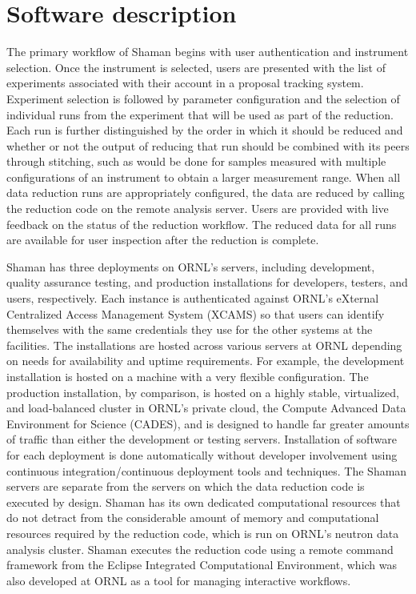 \section{Software description}
\label{description}

The primary workflow of Shaman begins with user authentication and instrument selection. Once the
instrument is selected, users are presented with the list of experiments associated with their
account in a proposal tracking system. Experiment selection is followed by parameter configuration
and the selection of individual runs from the experiment that will be used as part of the reduction.
Each run is further distinguished by the order in which it should be reduced and whether or not the
output of reducing that run should be combined with its peers through stitching, such as would be
done for samples measured with multiple configurations of an instrument to obtain a larger
measurement range. When all data reduction runs are appropriately configured, the data are reduced
by calling the reduction code on the remote analysis server. Users are provided with live feedback
on the status of the reduction workflow. The reduced data for all runs are available for user
inspection after the reduction is complete. 

Shaman has three deployments on ORNL’s servers, including development, quality assurance testing,
and production installations for developers, testers, and users, respectively. Each instance is
authenticated against ORNL’s eXternal Centralized Access Management System (XCAMS) so that users can
identify themselves with the same credentials they use for the other systems at the facilities. The
installations are hosted across various servers at ORNL depending on needs for availability and
uptime requirements. For example, the development installation is hosted on a machine with a very
flexible configuration. The production installation, by comparison, is hosted on a highly stable,
virtualized, and load-balanced cluster in ORNL’s private cloud, the Compute Advanced Data
Environment for Science (CADES), and is designed to handle far greater amounts of traffic than
either the development or testing servers. Installation of software for each deployment is done
automatically without developer involvement using continuous integration/continuous deployment tools
and techniques. The Shaman servers are separate from the servers on which the data reduction code is
executed by design. Shaman has its own dedicated computational resources that do not detract from
the considerable amount of memory and computational resources required by the reduction code, which
is run on ORNL’s neutron data analysis cluster. Shaman executes the reduction code using a remote
command framework from the Eclipse Integrated Computational Environment, which was also developed at
ORNL as a tool for managing interactive workflows.

